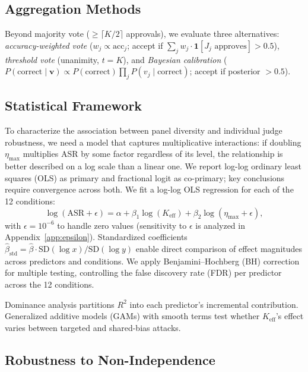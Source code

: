 \subsection{Aggregation Methods}

Beyond majority vote ($\geq \lceil K/2 \rceil$ approvals), we evaluate three alternatives: \emph{accuracy-weighted vote} ($w_j \propto \mathrm{acc}_j$; accept if $\sum_j w_j \cdot \mathbf{1}[J_j \text{ approves}] > 0.5$), \emph{threshold vote} (unanimity, $t{=}K$), and \emph{Bayesian calibration} ($P(\text{correct} \mid \mathbf{v}) \propto P(\text{correct}) \prod_j P(v_j \mid \text{correct})$; accept if posterior $> 0.5$).

\subsection{Statistical Framework}
\label{sec:stat_framework}

To characterize the association between panel diversity and individual judge robustness, we need a model that captures multiplicative interactions: if doubling $\eta_{\max}$ multiplies ASR by some factor regardless of its level, the relationship is better described on a log scale than a linear one. We report log-log ordinary least squares (OLS) as primary and fractional logit as co-primary; key conclusions require convergence across both. We fit a log-log OLS regression for each of the 12 conditions:
\begin{equation}
\label{eq:regression}
\log(\mathrm{ASR} + \epsilon) = \alpha + \beta_1 \log(K_{\mathrm{eff}}) + \beta_2 \log(\eta_{\max} + \epsilon),
\end{equation}
with $\epsilon = 10^{-6}$ to handle zero values (sensitivity to $\epsilon$ is analyzed in Appendix~\ref{app:epsilon}). Standardized coefficients $\hat{\beta}_{\mathrm{std}} = \hat{\beta} \cdot \mathrm{SD}(\log x) / \mathrm{SD}(\log y)$ enable direct comparison of effect magnitudes across predictors and conditions. We apply Benjamini--Hochberg (BH) correction \citep{benjamini1995controlling} for multiple testing, controlling the false discovery rate (FDR) per predictor across the 12 conditions.

Dominance analysis \citep{budescu1993dominance} partitions $R^2$ into each predictor's incremental contribution. Generalized additive models (GAMs) with smooth terms test whether $K_{\mathrm{eff}}$'s effect varies between targeted and shared-bias attacks.

\subsection{Robustness to Non-Independence}
\label{sec:robustness_method}

